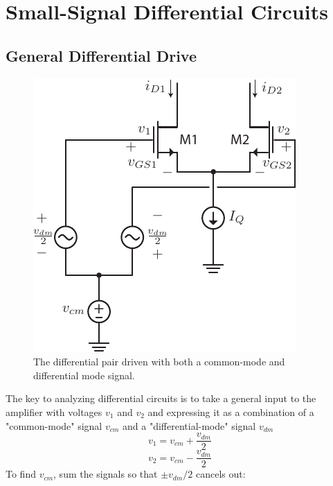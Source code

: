 \section{Small-Signal Differential Circuits}
\subsection{General Differential Drive}
\begin{figure}[tb]
\centering
\includegraphics[scale=1]{Diff_Pair_Diff_CM.pdf}
\caption{The differential pair driven with both a common-mode and differential mode signal.} \label{fig:Diff_Pair_Diff_CM.pdf}
\end{figure}
The key to analyzing differential circuits is to take a general input to the amplifier with voltages $v_1$ and $v_2$ and expressing it as a combination of a "common-mode" signal $v_{cm}$ and a "differential-mode" signal $v_{dm}$
    \begin{equation}
        v_1 = v_{cm} + \frac{v_{dm}}{2}
        \label{eq:v1}
    \end{equation}
    \begin{equation}
        v_2 = v_{cm} - \frac{v_{dm}}{2}
        \label{eq:v2}
    \end{equation}
To find $v_{cm}$, sum the signals so that $\pm v_{dm}/2$ cancels out:
